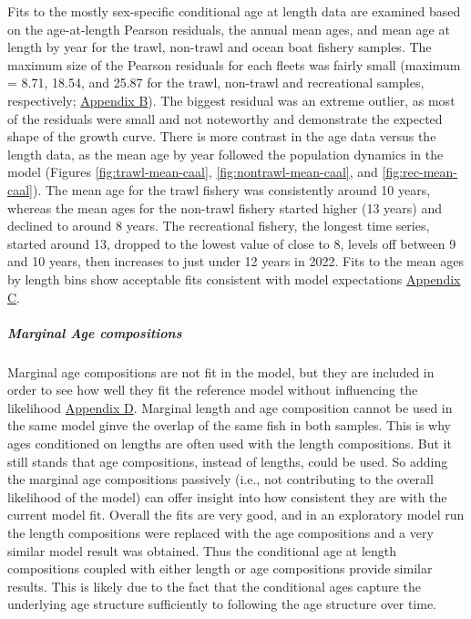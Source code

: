 \documentclass[11pt,
  english,
  letterpaper,
]{article}
\begin{document}
Fits to the mostly sex-specific conditional age at length data are examined based on the age-at-length Pearson residuals, the annual mean ages, and mean age at length by year for the trawl, non-trawl and ocean boat fishery samples. The maximum size of the Pearson residuals for each fleets was fairly small (maximum = 8.71, 18.54, and 25.87 for the trawl, non-trawl and recreational samples, respectively; \protect\hyperlink{app_b}{Appendix B}). The biggest residual was an extreme outlier, as most of the residuals were small and not noteworthy and demonstrate the expected shape of the growth curve. There is more contrast in the age data versus the length data, as the mean age by year followed the population dynamics in the model (Figures \ref{fig:trawl-mean-caal}, \ref{fig:nontrawl-mean-caal}, and \ref{fig:rec-mean-caal}). The mean age for the trawl fishery was consistently around 10 years, whereas the mean ages for the non-trawl fishery started higher (13 years) and declined to around 8 years. The recreational fishery, the longest time series, started around 13, dropped to the lowest value of close to 8, levels off between 9 and 10 years, then increases to just under 12 years in 2022. Fits to the mean ages by length bins show acceptable fits consistent with model expectations \protect\hyperlink{app_c}{Appendix C}.

\hypertarget{marginal-age-compositions}{%
\subparagraph{Marginal Age compositions}\label{marginal-age-compositions}}

Marginal age compositions are not fit in the model, but they are included in order to see how well they fit the reference model without influencing the likelihood \protect\hyperlink{app_d}{Appendix D}. Marginal length and age composition cannot be used in the same model ginve the overlap of the same fish in both samples. This is why ages conditioned on lengths are often used with the length compositions. But it still stands that age compositions, instead of lengths, could be used. So adding the marginal age compositions passively (i.e., not contributing to the overall likelihood of the model) can offer insight into how consistent they are with the current model fit. Overall the fits are very good, and in an exploratory model run the length compositions were replaced with the age compositions and a very similar model result was obtained. Thus the conditional age at length compositions coupled with either length or age compositions provide similar results. This is likely due to the fact that the conditional ages capture the underlying age structure sufficiently to following the age structure over time.
\end{document}
